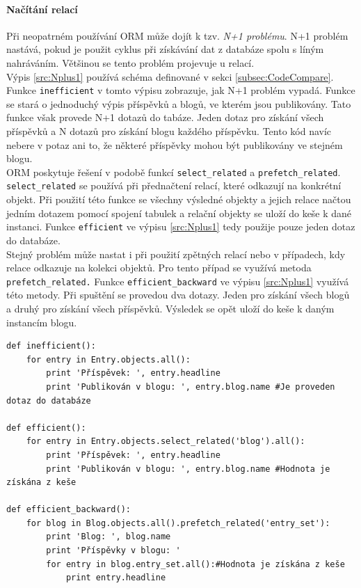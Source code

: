 \documentclass[ing,male,java,dept456]{diploma}						%
\begin{document}
\paragraph{Načítání relací} 
\label{par:N+1}
Při neopatrném používání ORM může dojít k tzv. \textit{N+1 problému}. N+1 problém nastává, pokud je použit cyklus při získávání dat z databáze spolu s líným nahráváním. Většinou se tento problém projevuje u relací. \\
Výpis \ref{src:Nplus1} používá schéma definované v sekci \ref{subsec:CodeCompare}. Funkce \lstinline[style=custompython]|inefficient| v tomto výpisu zobrazuje, jak N+1 problém vypadá. Funkce se stará o jednoduchý výpis příspěvků a blogů, ve kterém jsou publikovány. Tato funkce však provede N+1 dotazů do tabáze. Jeden dotaz pro získání všech příspěvků a N dotazů pro získání blogu každého příspěvku. Tento kód navíc nebere v potaz ani to, že některé příspěvky mohou být publikovány ve stejném blogu. \\
ORM poskytuje řešení v podobě funkcí \lstinline[style=custompython]|select_related| a \lstinline[style=custompython]|prefetch_related|. \\ 
\lstinline[style=custompython]|select_related| se používá při přednačtení relací, které odkazují na konkrétní objekt. Při použití této funkce se všechny výsledné objekty a jejich relace načtou jedním dotazem pomocí spojení tabulek a relační objekty se uloží do keše k dané instanci. Funkce \lstinline[style=custompython]|efficient| ve výpisu \ref{src:Nplus1} tedy použije pouze jeden dotaz do databáze. \\
Stejný problém může nastat i při použití zpětných relací nebo v případech, kdy relace odkazuje na kolekci objektů. Pro tento případ se využívá metoda \lstinline[style=custompython]|prefetch_related.| Funkce \lstinline[style=custompython]|efficient_backward| ve výpisu \ref{src:Nplus1} využívá této metody. Při spuštění se provedou dva dotazy. Jeden pro získání všech blogů a druhý pro získání všech příspěvků. Výsledek se opět uloží do keše k daným instancím blogu. 

\begin{lstlisting}[style=custompython, label=src:Nplus1, caption={N+1 problém a jeho řešení v Django ORM}]
def inefficient():
	for entry in Entry.objects.all():
		print 'Příspěvek: ', entry.headline
		print 'Publikován v blogu: ', entry.blog.name #Je proveden dotaz do databáze
		
def efficient():
	for entry in Entry.objects.select_related('blog').all():
		print 'Příspěvek: ', entry.headline
		print 'Publikován v blogu: ', entry.blog.name #Hodnota je získána z keše
		
def efficient_backward():
	for blog in Blog.objects.all().prefetch_related('entry_set'):
		print 'Blog: ', blog.name
		print 'Příspěvky v blogu: '
		for entry in blog.entry_set.all():#Hodnota je získána z keše
			print entry.headline
\end{lstlisting}
\end{document}

